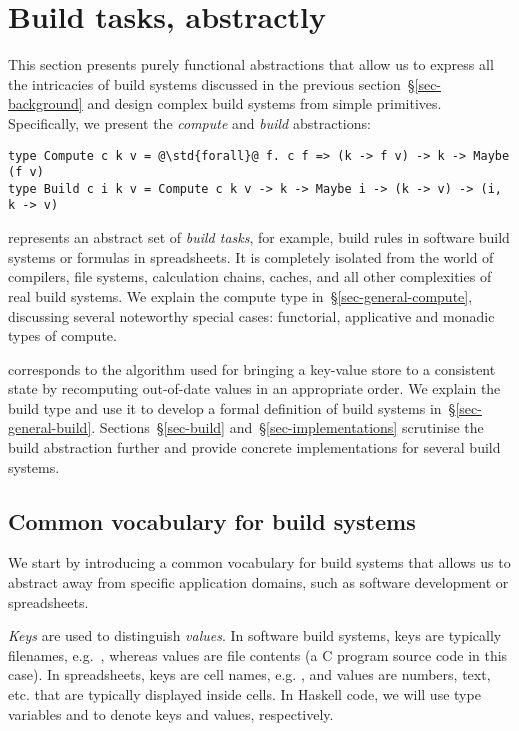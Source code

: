 \section{Build tasks, abstractly}\label{sec-compute}

This section presents purely functional abstractions that allow us to express
all the intricacies of build systems discussed in the previous
section~\S\ref{sec-background} and design complex build systems from simple
primitives. Specifically, we present the \emph{compute} and \emph{build}
abstractions:

\vspace{1mm}
\begin{verbatim}
type Compute c k v = @\std{forall}@ f. c f => (k -> f v) -> k -> Maybe (f v)
type Build c i k v = Compute c k v -> k -> Maybe i -> (k -> v) -> (i, k -> v)
\end{verbatim}
\vspace{1mm}

\noindent
{} represents an abstract set of \emph{build tasks}, for example, build
rules in software build systems or formulas in spreadsheets. It is completely
isolated from the world of compilers, file systems, calculation chains, caches,
and all other complexities of real build systems. We explain the compute type
in~\S\ref{sec-general-compute}, discussing several noteworthy special cases:
functorial, applicative and monadic types of compute.

 corresponds to the algorithm used for bringing a key-value store
\store to a consistent state by recomputing out-of-date values in an
appropriate order. We explain the build type and use it to develop a formal
definition of build systems in~\S\ref{sec-general-build}.
Sections~\S\ref{sec-build} and~\S\ref{sec-implementations} scrutinise the build
abstraction further and provide concrete implementations for several build
systems.

\subsection{Common vocabulary for build systems}
\label{sec-vocabulary}

We start by introducing a common vocabulary for build systems that allows
us to abstract away from specific application domains, such as software
development or spreadsheets.

\emph{Keys} are used to distinguish \emph{values}. In software build systems,
keys are typically filenames, e.g.~, whereas values are file
contents (a C program source code in this case). In spreadsheets, keys are cell
names, e.g. , and values are numbers, text, etc. that are typically
displayed inside cells. In Haskell code, we will use type variables 
and  to denote keys and values, respectively.

